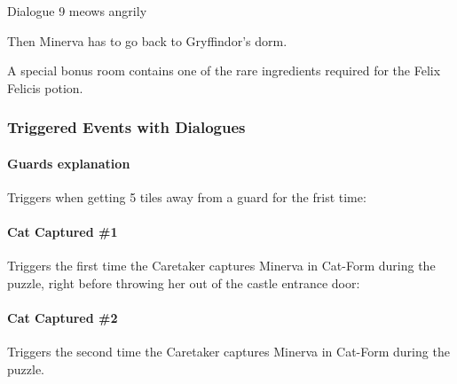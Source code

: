 \begin{dialogue}{Dialogue 9} 
	\*meows angrily\*
\end{dialogue} 


Then Minerva has to go back to Gryffindor's dorm.

A special bonus room contains one of the rare ingredients required for the Felix Felicis potion.

\subsubsection{Triggered Events with Dialogues}

\paragraph{Guards explanation} Triggers when getting 5 tiles away from a guard for the frist time:

\begin{dialogue}{} 
\end{dialogue}

\paragraph{Cat Captured \#1} Triggers the first time the Caretaker captures Minerva in Cat-Form during the puzzle, right before throwing her out of the castle entrance door:

\begin{dialogue}{} 
\end{dialogue} 

\paragraph{Cat Captured \#2} Triggers the second time the Caretaker captures Minerva in Cat-Form during the puzzle.

\begin{dialogue}{} 
\end{dialogue} 


